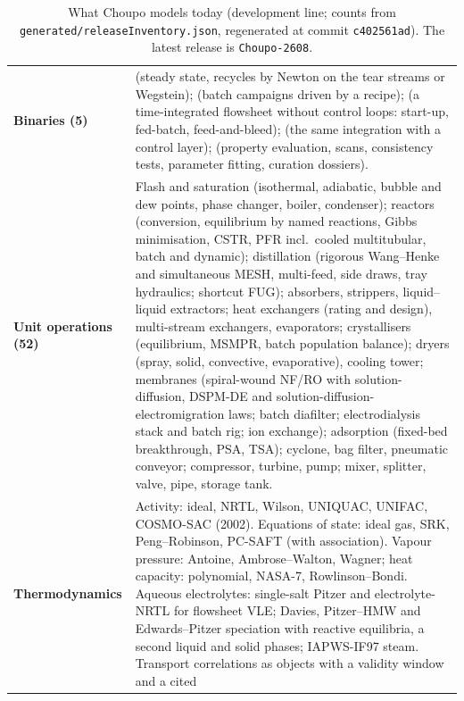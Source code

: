 \documentclass[11pt,a4paper]{article}
\newcommand{\code}[1]{\texttt{\detokenize{#1}}}
\begin{document}
\begin{table}[!t]
\centering\scriptsize
\caption{What Choupo models today (development line; counts from
\texttt{generated/releaseInventory.json}, regenerated at commit
\texttt{c402561ad}).  The latest release is \texttt{Choupo-2608}.}
\label{tab:scope}
\renewcommand{\arraystretch}{1.12}
\begin{tabularx}{\linewidth}{>{\raggedright\arraybackslash}p{3.1cm}
                             >{\raggedright\arraybackslash}X}
\toprule
\textbf{Binaries (5)} & \code{choupoSolve} (steady state, recycles by Newton
  on the tear streams or Wegstein); \code{choupoBatch} (batch campaigns
  driven by a recipe); \code{choupoSemiContinuous} (a time-integrated
  flowsheet without control loops: start-up, fed-batch, feed-and-bleed);
  \code{choupoCtrl} (the same integration with a control layer);
  \code{choupoProps} (property evaluation, scans, consistency tests,
  parameter fitting, curation dossiers). \\
\textbf{Unit operations (52)} & Flash and saturation (isothermal, adiabatic,
  bubble and dew points, phase changer, boiler, condenser); reactors
  (conversion, equilibrium by named reactions, Gibbs minimisation, CSTR,
  PFR incl.\ cooled multitubular, batch and dynamic); distillation
  (rigorous Wang--Henke and simultaneous MESH, multi-feed, side draws, tray
  hydraulics; shortcut FUG); absorbers, strippers, liquid--liquid
  extractors; heat exchangers (rating and design), multi-stream exchangers,
  evaporators; crystallisers (equilibrium, MSMPR, batch population
  balance); dryers (spray, solid, convective, evaporative), cooling tower;
  membranes (spiral-wound NF/RO with solution-diffusion, DSPM-DE and
  solution-diffusion-electromigration laws; batch diafilter;
  electrodialysis stack and batch rig; ion exchange); adsorption (fixed-bed
  breakthrough, PSA, TSA); cyclone, bag filter, pneumatic conveyor;
  compressor, turbine, pump; mixer, splitter, valve, pipe, storage tank. \\
\textbf{Thermodynamics} & Activity: ideal, NRTL, Wilson, UNIQUAC, UNIFAC,
  COSMO-SAC (2002).  Equations of state: ideal gas, SRK, Peng--Robinson,
  PC-SAFT (with association).  Vapour pressure: Antoine, Ambrose--Walton,
  Wagner; heat capacity: polynomial, NASA-7, Rowlinson--Bondi.  Aqueous
  electrolytes: single-salt Pitzer and electrolyte-NRTL for flowsheet VLE;
  Davies, Pitzer--HMW and Edwards--Pitzer speciation with reactive
  equilibria, a second liquid and solid phases; IAPWS-IF97 steam.
  Transport correlations as objects with a validity window and a cited

\end{tabularx}
\end{table}
\end{document}
